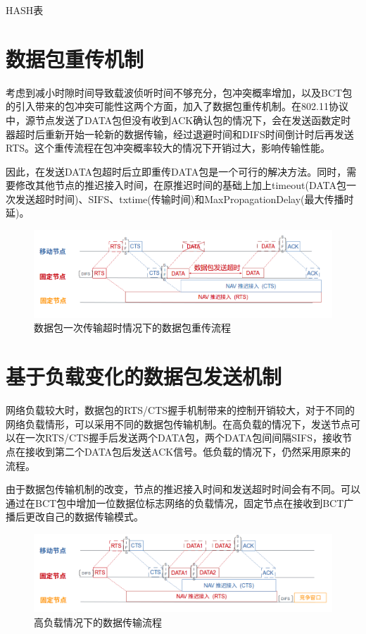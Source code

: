 HASH表

\section {数据包重传机制}
考虑到减小时隙时间导致载波侦听时间不够充分，包冲突概率增加，以及BCT包的引入带来的包冲突可能性这两个方面，加入了数据包重传机制。在802.11协议中，源节点发送了DATA包但没有收到ACK确认包的情况下，会在发送函数定时器超时后重新开始一轮新的数据传输，经过退避时间和DIFS时间倒计时后再发送RTS。这个重传流程在包冲突概率较大的情况下开销过大，影响传输性能。

因此，在发送DATA包超时后立即重传DATA包是一个可行的解决方法。同时，需要修改其他节点的推迟接入时间，在原推迟时间的基础上加上timeout(DATA包一次发送超时时间)、SIFS、txtime(传输时间)和MaxPropagationDelay(最大传播时延)。

\begin{figure}[!ht]
	\centering
	\includegraphics[scale=0.4]{figures/chongchuan.png}
	\caption{
	     数据包一次传输超时情况下的数据包重传流程
	}
	\label{fig:example}
\end{figure}

\section {基于负载变化的数据包发送机制}
网络负载较大时，数据包的RTS/CTS握手机制带来的控制开销较大，对于不同的网络负载情形，可以采用不同的数据包传输机制。在高负载的情况下，发送节点可以在一次RTS/CTS握手后发送两个DATA包，两个DATA包间间隔SIFS，接收节点在接收到第二个DATA包后发送ACK信号。低负载的情况下，仍然采用原来的流程。

由于数据包传输机制的改变，节点的推迟接入时间和发送超时时间会有不同。可以通过在BCT包中增加一位数据位标志网络的负载情况，固定节点在接收到BCT广播后更改自己的数据传输模式。
\begin{figure}[ht]
	\centering
	\includegraphics[scale=0.4]{figures/highload.png}
	\caption{
		高负载情况下的数据传输流程
	}
	\label{fig:example}
\end{figure}



\endinput